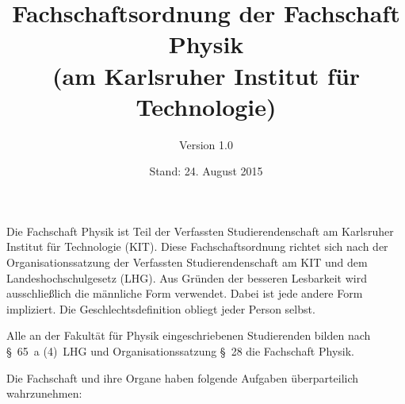\documentclass[a4paper, parskip=half, numbers=noenddot]{scrartcl}
\title{Fachschaftsordnung der Fachschaft Physik\\(am Karlsruher Institut für Technologie)}
\author{Version 1.0}
\date{Stand: 24. August 2015}
\begin{document}
%
%

\maketitle
\thispagestyle{empty}

\pagestyle{empty}
\newpage
\rule{0mm}{0mm}
\newpage


\begin{contract}

\setcounter{page}{1}
\pagestyle{plain}


%
%

\tableofcontents
\newpage


%
%

Die Fachschaft Physik ist Teil der Verfassten Studierendenschaft am Karlsruher Institut für Technologie (KIT). Diese Fachschaftsordnung richtet sich nach der Organisationssatzung der Verfassten Studierendenschaft am KIT und dem Landeshochschulgesetz (LHG). Aus Gründen der besseren Lesbarkeit wird ausschließlich die männliche Form verwendet. Dabei ist jede andere Form impliziert. Die Geschlechtsdefinition obliegt jeder Person selbst.


%
%


Alle an der Fakultät für Physik eingeschriebenen Studierenden
bilden nach §~65~a (4)~LHG und Organisationssatzung §~28 die Fachschaft Physik.


%
%

%
\label{fs:aufgaben}

Die Fachschaft und ihre Organe haben folgende Aufgaben überparteilich wahrzunehmen:


\end{contract}
\end{document}
